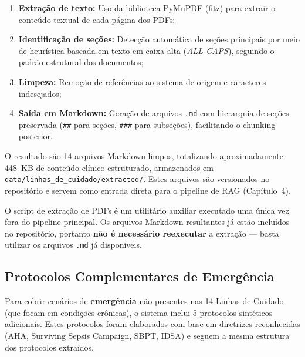 \begin{enumerate}
    \item \textbf{Extração de texto:} Uso da biblioteca PyMuPDF (fitz) para extrair o conteúdo textual de cada página dos PDFs;
    \item \textbf{Identificação de seções:} Detecção automática de seções principais por meio de heurística baseada em texto em caixa alta (\textit{ALL CAPS}), seguindo o padrão estrutural dos documentos;
    \item \textbf{Limpeza:} Remoção de referências ao sistema de origem e caracteres indesejados;
    \item \textbf{Saída em Markdown:} Geração de arquivos \texttt{.md} com hierarquia de seções preservada (\texttt{\#\#} para seções, \texttt{\#\#\#} para subseções), facilitando o chunking posterior.
\end{enumerate}

O resultado são 14 arquivos Markdown limpos, totalizando aproximadamente 448~KB de conteúdo clínico estruturado, armazenados em \texttt{data/linhas\_de\_cuidado/extracted/}. Estes arquivos são versionados no repositório e servem como entrada direta para o pipeline de RAG (Capítulo~4).

\begin{infobox}
O script de extração de PDFs é um utilitário auxiliar executado uma única vez fora do pipeline principal. Os arquivos Markdown resultantes já estão incluídos no repositório, portanto \textbf{não é necessário reexecutar} a extração --- basta utilizar os arquivos \texttt{.md} já disponíveis.
\end{infobox}

\subsection{Protocolos Complementares de Emergência}

Para cobrir cenários de \textbf{emergência} não presentes nas 14 Linhas de Cuidado (que focam em condições crônicas), o sistema inclui 5 protocolos sintéticos adicionais. Estes protocolos foram elaborados com base em diretrizes reconhecidas (AHA, Surviving Sepsis Campaign, SBPT, IDSA) e seguem a mesma estrutura dos protocolos extraídos.


